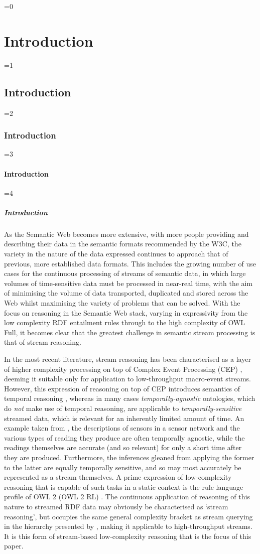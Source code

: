 \documentclass[twocolumn,preprint,3p,number]{elsarticle}
\theoremstyle{plain}
\theoremstyle{definition}
\newcounter{nestingdepth}
\newenvironment{nestedsection}[2]{
  \ifnum\value{nestingdepth}=0
    \chapter{#1}
  \else
    \ifnum\value{nestingdepth}=1
      \section{#1}
    \else
      \ifnum\value{nestingdepth}=2
        \subsection{#1}
      \else
        \ifnum\value{nestingdepth}=3
          \subsubsection{#1}
        \else
          \ifnum\value{nestingdepth}=4
            \paragraph{#1}
          \else
            \PackageError{nestedsections}{Maximum nesting level exceeded!}{uh oh!}
          \fi
        \fi
      \fi
    \fi
  \fi
  \addtocounter{nestingdepth}{1}
  \label{sec:#2}
}{\addtocounter{nestingdepth}{-1}}
\begin{document}
\begin{nestedsection}{Introduction}{intro}
  As the Semantic Web becomes more extensive, with more people providing and describing their data in the semantic formats recommended by the W3C, the variety in the nature of the data expressed continues to approach that of previous, more established data formats.
  This includes the growing number of use cases for the continuous processing of streams of semantic data, in which large volumes of time-sensitive data must be processed in near-real time, with the aim of minimising the volume of data transported, duplicated and stored across the Web whilst maximising the variety of problems that can be solved.
  With the focus on reasoning in the Semantic Web stack, varying in expressivity from the low complexity RDF entailment rules through to the high complexity of OWL Full, it becomes clear that the greatest challenge in semantic stream processing is that of stream reasoning.

  In the most recent literature, stream reasoning has been characterised as a layer of higher complexity processing on top of Complex Event Processing (CEP) \citep{mileo15webSR}, deeming it suitable only for application to low-throughput macro-event streams.
  However, this expression of reasoning on top of CEP introduces semantics of temporal reasoning \citep{OrgunWadge92,Tuzhilin93}, whereas in many cases \emph{temporally-agnostic} ontologies, which do \emph{not} make use of temporal reasoning, are applicable to \emph{temporally-sensitive} streamed data, which is relevant for an inherently limited amount of time.
  An example taken from \citep{margara14streamWeb}, the descriptions of sensors in a sensor network and the various types of reading they produce are often temporally agnostic, while the readings themselves are accurate (and so relevant) for only a short time after they are produced.
  Furthermore, the inferences gleaned from applying the former to the latter are equally temporally sensitive, and so may most accurately be represented as a stream themselves.
  A prime expression of low-complexity reasoning that is capable of such tasks in a static context is the rule language profile of OWL 2 (OWL 2 RL) \citep{w3cowl2profiles}.
  The continuous application of reasoning of this nature to streamed RDF data may obviously be characterised as `stream reasoning', but occupies the same general complexity bracket as stream querying in the hierarchy presented by \citep{mileo15webSR}, making it applicable to high-throughput streams.
  It is this form of stream-based low-complexity reasoning that is the focus of this paper.


\end{nestedsection}
\end{document}
